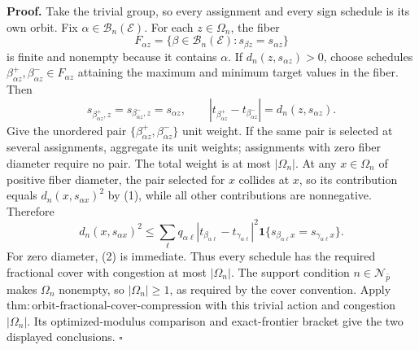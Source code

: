 \textbf{Proof.}
Take the trivial group, so every assignment and every sign schedule is its own orbit. Fix \(\alpha\in\mathcal B_n(\mathcal E)\). For each \(z\in\Omega_n\), the fiber
\[
 F_{\alpha z}
 =\{\beta\in\mathcal B_n(\mathcal E):s_{\beta z}=s_{\alpha z}\}
\]
is finite and nonempty because it contains \(\alpha\). If \(d_n(z,s_{\alpha z})>0\), choose schedules \(\beta^+_{\alpha z},\beta^-_{\alpha z}\in F_{\alpha z}\) attaining the maximum and minimum target values in the fiber. Then
\[
 s_{\beta^+_{\alpha z},z}=s_{\beta^-_{\alpha z},z}=s_{\alpha z},
 \qquad
 |t_{\beta^+_{\alpha z}}-t_{\beta^-_{\alpha z}}|
 =d_n(z,s_{\alpha z}). \tag{1}
\]
Give the unordered pair \(\{\beta^+_{\alpha z},\beta^-_{\alpha z}\}\) unit weight. If the same pair is selected at several assignments, aggregate its unit weights; assignments with zero fiber diameter require no pair. The total weight is at most \(|\Omega_n|\). At any \(x\in\Omega_n\) of positive fiber diameter, the pair selected for \(x\) collides at \(x\), so its contribution equals \(d_n(x,s_{\alpha x})^2\) by (1), while all other contributions are nonnegative. Therefore
\[
 d_n(x,s_{\alpha x})^2
 \le
 \sum_\ell q_{\alpha\ell}
 |t_{\beta_{\alpha\ell}}-t_{\gamma_{\alpha\ell}}|^2
 \mathbf 1\{s_{\beta_{\alpha\ell}x}=s_{\gamma_{\alpha\ell}x}\}. \tag{2}
\]
For zero diameter, (2) is immediate. Thus every schedule has the required fractional cover with congestion at most \(|\Omega_n|\). The support condition \(n\in\mathcal N_{\bar p}\) makes \(\Omega_n\) nonempty, so \(|\Omega_n|\ge1\), as required by the cover convention. Apply \(\mathrm{thm{:}orbit\text{-}fractional\text{-}cover\text{-}compression}\) with this trivial action and congestion \(|\Omega_n|\). Its optimized-modulus comparison and exact-frontier bracket give the two displayed conclusions. \(\square\)